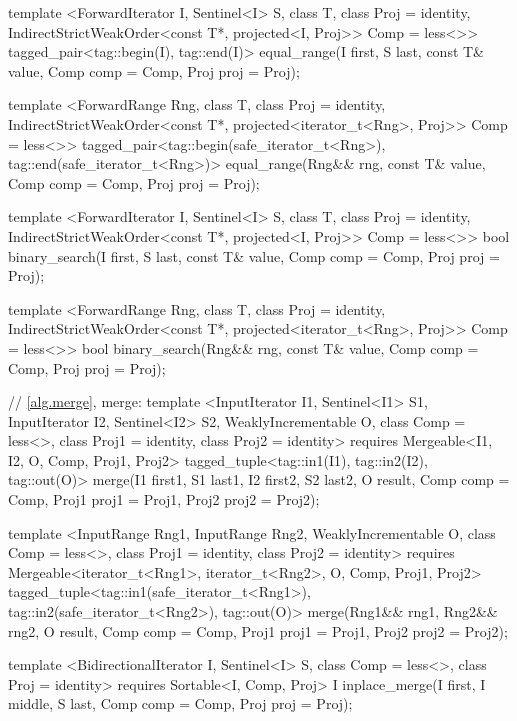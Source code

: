 \begin{codeblock}
{{{{  template <ForwardIterator I, Sentinel<I> S, class T, class Proj = identity,
      IndirectStrictWeakOrder<const T*, projected<I, Proj>> Comp = less<>>
    tagged_pair<tag::begin(I), tag::end(I)>
      equal_range(I first, S last, const T& value, Comp comp = Comp{}, Proj proj = Proj{});

  template <ForwardRange Rng, class T, class Proj = identity,
      IndirectStrictWeakOrder<const T*, projected<iterator_t<Rng>, Proj>> Comp = less<>>
    tagged_pair<tag::begin(safe_iterator_t<Rng>),
                tag::end(safe_iterator_t<Rng>)>
      equal_range(Rng&& rng, const T& value, Comp comp = Comp{}, Proj proj = Proj{});

  template <ForwardIterator I, Sentinel<I> S, class T, class Proj = identity,
      IndirectStrictWeakOrder<const T*, projected<I, Proj>> Comp = less<>>
    bool
      binary_search(I first, S last, const T& value, Comp comp = Comp{},
                    Proj proj = Proj{});

  template <ForwardRange Rng, class T, class Proj = identity,
      IndirectStrictWeakOrder<const T*, projected<iterator_t<Rng>, Proj>> Comp = less<>>
    bool
      binary_search(Rng&& rng, const T& value, Comp comp = Comp{},
                    Proj proj = Proj{});

  // \ref{alg.merge}, merge:
  template <InputIterator I1, Sentinel<I1> S1, InputIterator I2, Sentinel<I2> S2,
      WeaklyIncrementable O, class Comp = less<>, class Proj1 = identity,
      class Proj2 = identity>
    requires Mergeable<I1, I2, O, Comp, Proj1, Proj2>
    tagged_tuple<tag::in1(I1), tag::in2(I2), tag::out(O)>
      merge(I1 first1, S1 last1, I2 first2, S2 last2, O result,
            Comp comp = Comp{}, Proj1 proj1 = Proj1{}, Proj2 proj2 = Proj2{});

  template <InputRange Rng1, InputRange Rng2, WeaklyIncrementable O, class Comp = less<>,
      class Proj1 = identity, class Proj2 = identity>
    requires Mergeable<iterator_t<Rng1>, iterator_t<Rng2>, O, Comp, Proj1, Proj2>
    tagged_tuple<tag::in1(safe_iterator_t<Rng1>),
                 tag::in2(safe_iterator_t<Rng2>),
                 tag::out(O)>
      merge(Rng1&& rng1, Rng2&& rng2, O result,
            Comp comp = Comp{}, Proj1 proj1 = Proj1{}, Proj2 proj2 = Proj2{});

  template <BidirectionalIterator I, Sentinel<I> S, class Comp = less<>,
      class Proj = identity>
    requires Sortable<I, Comp, Proj>
    I
      inplace_merge(I first, I middle, S last, Comp comp = Comp{}, Proj proj = Proj{});

}}}}
\end{codeblock}
